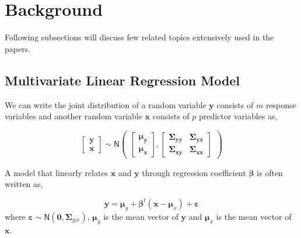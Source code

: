 \documentclass[11pt,twoside,openright,titlepage,
  headinclude,footinclude,BCOR=5mm,
  numbers=noenddot,cleardoublepage=empty,
  tablecaptionabove, dottedtoc,
  bibliography=totoc]{scrreprt}
\begin{document}
\hypertarget{background}{%
\chapter{Background}\label{background}}

Following subsections will discuss few related topics extensively used in the papers.

\hypertarget{multivariate-linear-regression-model}{%
\section{Multivariate Linear Regression Model}\label{multivariate-linear-regression-model}}

We can write the joint distribution of a random variable \(\mathbf{y}\) consists of \(m\) response variables and another random variable \(\mathbf{x}\) consists of \(p\) predictor variables as,

\begin{equation}
\begin{bmatrix}
  \mathbf{y}\\
  \mathbf{x}
\end{bmatrix} \sim
\mathsf{N}\begin{pmatrix}
  \begin{bmatrix}
    \boldsymbol{\mu_y}\\
    \boldsymbol{\mu_x}
  \end{bmatrix},
  \begin{bmatrix}
    \boldsymbol{\Sigma_{yy}} &
    \boldsymbol{\Sigma_{yx}} \\
    \boldsymbol{\Sigma_{xy}} &
    \boldsymbol{\Sigma_{xx}}
  \end{bmatrix}
\end{pmatrix}
\label{eq:linear-model}
\end{equation}

A model that linearly relates \(\mathbf{x}\) and \(\mathbf{y}\) through regression coefficient \(\boldsymbol{\beta}\) is often written as,

\begin{equation}
\mathbf{y} = \boldsymbol{\mu}_y + \boldsymbol{\beta}^t\left(\mathbf{x} - \boldsymbol{\mu}_x\right) + \boldsymbol{\varepsilon}
\label{eq:linear-reg-model}
\end{equation}
where \(\boldsymbol{\varepsilon} \sim \textsf{N}\left(\mathbf{0}, \boldsymbol{\Sigma}_{y|x}\right)\), \(\boldsymbol{\mu}_y\) is the mean vector of \(\mathbf{y}\) and \(\boldsymbol{\mu}_x\) is the mean vector of \(\mathbf{x}\).
\end{document}
